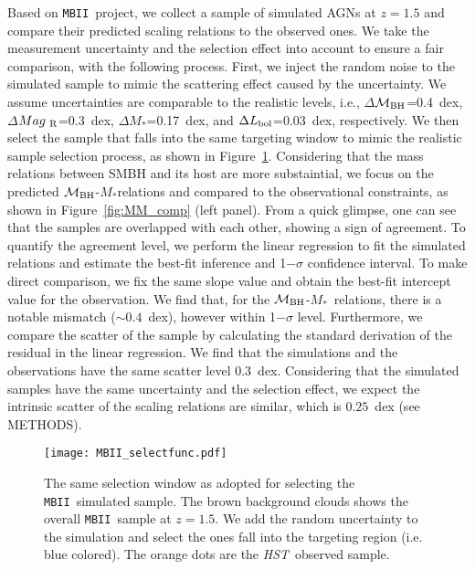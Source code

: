 \documentclass{natureprintstyle}
\newcommand{\hst}{{\it HST}}
\newcommand{\mbh}{$\mathcal M_{\rm BH}$}
\newcommand{\mr}{$Mag_{\rm ~R}$}
\newcommand{\mstar}{{$M_*$}}
\newcommand{\mbii}{\texttt{MBII}}
\begin{document}
Based on \mbii\ project, we collect a sample of simulated AGNs at $z=1.5$ and compare their predicted scaling relations to the observed ones. We take the measurement uncertainty and the selection effect into account to ensure a fair comparison,  with the following process. First, we inject the random noise to the simulated sample to mimic the scattering effect caused by the uncertainty. We assume uncertainties are comparable to the realistic levels, i.e., $\Delta$\mbh =0.4~dex, $\Delta$\mr=0.3~dex, $\Delta$\mstar=0.17~dex, and $\Delta L_{\rm bol}$=0.03~dex, respectively. We then select the sample that falls into the same targeting window to mimic the realistic sample selection process, as shown in Figure~\ref{fig:selectfunc}. Considering that the mass relations between SMBH and its host are more substaintial, we focus on the predicted \mbh-\mstar relations and compared to the observational constraints, as shown in Figure~\ref{fig:MM_comp} (left panel). From a quick glimpse, one can see that the samples are overlapped with each other, showing a sign of agreement. To quantify the agreement level, we perform the linear regression to fit the simulated relations and estimate the best-fit inference and 1$-\sigma$ confidence interval. To make direct comparison, we fix the same slope value and obtain the best-fit intercept value for the observation. We find that, for the \mbh-\mstar\ relations, there is a notable mismatch ($\sim0.4$~dex), however within 1$-\sigma$ level. Furthermore, we compare the scatter of the sample by calculating the standard derivation of the residual in the linear regression. We find that the simulations and the observations have the same scatter level $0.3$~dex. Considering that the simulated samples have the same uncertainty and the selection effect, we expect the intrinsic scatter of the scaling relations are similar, which is $0.25$~dex (see METHODS).

\begin{figure}[t]
\texttt{[image: MBII\_selectfunc.pdf]}
\caption{The same selection window as adopted for selecting the \mbii\ simulated sample. The brown background clouds shows the overall \mbii\ sample at $z=1.5$. We add the random uncertainty to the simulation and select the ones fall into the targeting region (i.e. blue colored). The orange dots are the \hst\ observed sample.}
\label{fig:selectfunc}
\end{figure}
\end{document}
